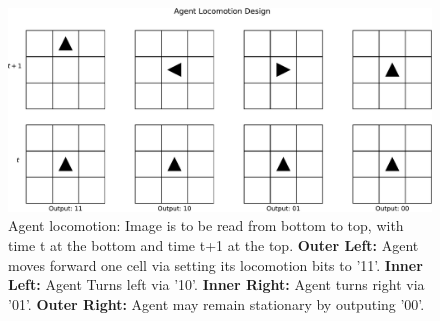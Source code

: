 \begin{figure}[!htbp]
\begin{center}
\includegraphics[width=\textwidth]{img/movement_explanatory}
\caption{
Agent locomotion: Image is to be read from bottom to top, with time t at the bottom and time t+1 at the top. \textbf{Outer Left:} Agent moves forward one cell via setting its locomotion bits to '11'. \textbf{Inner Left:} Agent Turns left via '10'. \textbf{Inner Right:} Agent turns right via '01'. \textbf{Outer Right:} Agent may remain stationary by outputing '00'.
}
\label{fig:movement_explanatory}
\end{center}
\end{figure}
